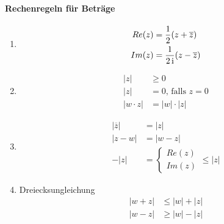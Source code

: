 \paragraph{Rechenregeln für Beträge}
\begin{enumerate}

\item
\begin{align*}
Re(z) & = \frac{1}{2} (z+\overline{z}) \\
Im(z) & = \frac{1}{2\operatorname{i}} (z - \overline{z})
\end{align*}

\item
\begin{align*}
|z| & \geq 0 \\
|z| & = 0 \text{, falls } z=0 \\
|w\cdot z| & = |w| \cdot |z|
\end{align*}

\item
\begin{align*}
|\overline{z}| & = |z| \\
|z - w| & = |w - z| \\
-|z| & = \begin{cases} Re(z) \\ Im(z) \end{cases} \leq |z|
\end{align*}

\item Dreiecksungleichung
\begin{align*}
|w + z| & \leq |w| + |z| \\
|w - z| & \geq |w| - |z|
\end{align*}
\end{enumerate}
\newpage
